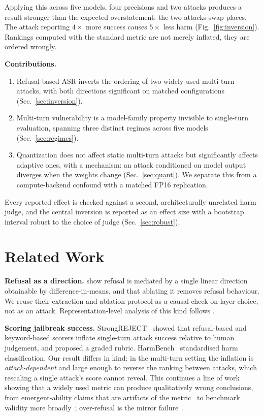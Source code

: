 \documentclass[10pt,twocolumn]{article}
\begin{document}
Applying this across five models, four precisions and two attacks produces a
result stronger than the expected overstatement: the two attacks swap places.
The attack reporting $4\times$ more success causes $5\times$ less harm
(Fig.~\ref{fig:inversion}). Rankings computed with the standard metric are not
merely inflated, they are ordered wrongly.

\smallskip\noindent\textbf{Contributions.}
\begin{enumerate}
\item Refusal-based ASR inverts the ordering of two widely used multi-turn
attacks, with both directions significant on matched configurations
(Sec.~\ref{sec:inversion}).
\item Multi-turn vulnerability is a model-family property invisible to
single-turn evaluation, spanning three distinct regimes across five models
(Sec.~\ref{sec:regimes}).
\item Quantization does not affect static multi-turn attacks but significantly
affects adaptive ones, with a mechanism: an attack conditioned on model output
diverges when the weights change (Sec.~\ref{sec:quant}). We separate this from a
compute-backend confound with a matched FP16 replication.
\end{enumerate}
Every reported effect is checked against a second, architecturally unrelated harm
judge, and the central inversion is reported as an effect size with a bootstrap
interval robust to the choice of judge (Sec.~\ref{sec:robust}).

\section{Related Work}

\textbf{Refusal as a direction.} \citet{arditi2024refusal} show
refusal is mediated by a single linear direction obtainable by
difference-in-means, and that ablating it removes refusal behaviour. We reuse
their extraction and ablation protocol as a causal check on layer choice, not as
an attack. Representation-level analysis of this kind follows
\citet{zou2023representation}.

\textbf{Scoring jailbreak success.} StrongREJECT~\citep{souly2024strongreject}
showed that refusal-based and keyword-based scorers inflate single-turn attack
success relative to human judgement, and proposed a graded rubric.
HarmBench~\citep{mazeika2024harmbench} standardised harm classification. Our
result differs in kind: in the multi-turn setting the inflation is
\emph{attack-dependent} and large enough to reverse the ranking between attacks,
which rescaling a single attack's score cannot reveal. This continues a line of
work showing that a widely used metric can produce qualitatively wrong
conclusions, from emergent-ability claims that are artifacts of the
metric~\citep{schaeffer2023emergent} to benchmark validity more
broadly~\citep{raji2021everything,miller2024error}; over-refusal is the mirror
failure~\citep{rottger2024xstest}.
\end{document}

